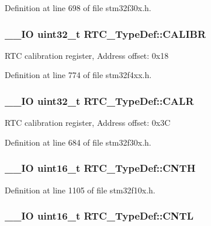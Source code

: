 Definition at line 698 of file stm32f30x.\-h.

\hypertarget{struct_r_t_c___type_def_a2403d29b2bfffb734ebef6642c0d2724}{
\subsubsection[{C\-A\-L\-I\-B\-R}]{\setlength{\rightskip}{0pt plus 5cm}\-\_\-\-\_\-\-I\-O {\bf uint32\-\_\-t} R\-T\-C\-\_\-\-Type\-Def\-::\-C\-A\-L\-I\-B\-R}}\label{struct_r_t_c___type_def_a2403d29b2bfffb734ebef6642c0d2724}
R\-T\-C calibration register, Address offset\-: 0x18 

Definition at line 774 of file stm32f4xx.\-h.

\hypertarget{struct_r_t_c___type_def_aea66ea813830c2f3ff207464794397a4}{
\subsubsection[{C\-A\-L\-R}]{\setlength{\rightskip}{0pt plus 5cm}\-\_\-\-\_\-\-I\-O {\bf uint32\-\_\-t} R\-T\-C\-\_\-\-Type\-Def\-::\-C\-A\-L\-R}}\label{struct_r_t_c___type_def_aea66ea813830c2f3ff207464794397a4}
R\-T\-C calibration register, Address offset\-: 0x3\-C 

Definition at line 684 of file stm32f30x.\-h.

\hypertarget{struct_r_t_c___type_def_a094741bcc8fca018b500f7468531f0ef}{
\subsubsection[{C\-N\-T\-H}]{\setlength{\rightskip}{0pt plus 5cm}\-\_\-\-\_\-\-I\-O {\bf uint16\-\_\-t} R\-T\-C\-\_\-\-Type\-Def\-::\-C\-N\-T\-H}}\label{struct_r_t_c___type_def_a094741bcc8fca018b500f7468531f0ef}


Definition at line 1105 of file stm32f10x.\-h.

\hypertarget{struct_r_t_c___type_def_a212cb62d18ce312bc3f69641aa76688d}{
\subsubsection[{C\-N\-T\-L}]{\setlength{\rightskip}{0pt plus 5cm}\-\_\-\-\_\-\-I\-O {\bf uint16\-\_\-t} R\-T\-C\-\_\-\-Type\-Def\-::\-C\-N\-T\-L}}\label{struct_r_t_c___type_def_a212cb62d18ce312bc3f69641aa76688d}


